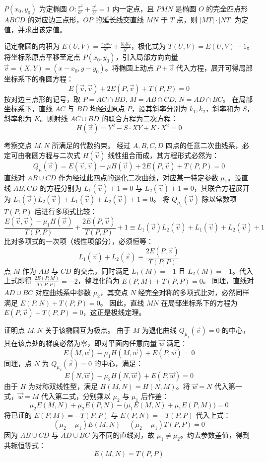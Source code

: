 \begin{exercise}
     \(P(x_0,y_0)\) 为定椭圆 \(O:\frac{x^2}{a^2}+\frac{y^2}{b^2}=1\) 内一定点，且 \(PMN\) 是椭圆 \(O\) 的完全四点形 \(ABCD\) 的对应边三点形，\(OP\) 的延长线交直线 \(MN\) 于 \(T\) 点，则 \(|MT|\cdot|NT|\) 为定值，并求出该定值。
\end{exercise}
\begin{solution}
记定椭圆的内积为 $E(U,V) = \frac{x_U x_V}{a^2} + \frac{y_U y_V}{b^2}$，极化式为 $T(U,V) = E(U,V) - 1$。
将坐标系原点平移至定点 $P(x_0, y_0)$，引入局部方向向量 $\vec{v} = (X, Y) = (x-x_0, y-y_0)$。将椭圆上动点 $P+\vec{v}$ 代入方程，展开可得局部坐标系下的椭圆方程：
$$ E(\vec{v}, \vec{v}) + 2E(P, \vec{v}) + T(P,P) = 0 $$
按对边三点形的记号，取 $P = AC \cap BD$, $M = AB \cap CD$, $N = AD \cap BC$。
在局部坐标系下，直线 $AC$ 与 $BD$ 均经过原点 $P$，设其斜率分别为 $k_1, k_2$，斜率和为 $S$，斜率积为 $K$。则射线 $AC \cup BD$ 的联合方程为二次方程：
$$ H(\vec{v}) = Y^2 - S \cdot XY + K \cdot X^2 = 0 $$

考察交点 $M, N$ 所满足的代数约束。
经过 $A,B,C,D$ 四点的任意二次曲线系，必定可由椭圆方程与二次式 $H(\vec{v})$ 线性组合而成，其方程形式必然为：
$$ Q_\mu(\vec{v}) = E(\vec{v},\vec{v}) - \mu H(\vec{v}) + 2E(P, \vec{v}) + T(P,P) = 0 $$
直线对 $AB \cup CD$ 作为经过此四点的退化二次曲线，对应某一特定参数 $\mu_1$。设直线 $AB, CD$ 的方程分别为 $L_1(\vec{v}) + 1 = 0$ 与 $L_2(\vec{v}) + 1 = 0$，其联合方程展开为 $L_1(\vec{v})L_2(\vec{v}) + L_1(\vec{v}) + L_2(\vec{v}) + 1 = 0$。
将 $Q_{\mu_1}(\vec{v})$ 除以常数项 $T(P,P)$ 后进行多项式比较：
$$ \frac{E(\vec{v},\vec{v}) - \mu_1 H(\vec{v})}{T(P,P)} + \frac{2E(P, \vec{v})}{T(P,P)} + 1 \equiv L_1(\vec{v})L_2(\vec{v}) + L_1(\vec{v}) + L_2(\vec{v}) + 1 $$
比对多项式的一次项（线性项部分），必须恒等：
$$ L_1(\vec{v}) + L_2(\vec{v}) \equiv \frac{2E(P, \vec{v})}{T(P,P)} $$
点 $M$ 作为 $AB$ 与 $CD$ 的交点，同时满足 $L_1(M) = -1$ 且 $L_2(M) = -1$。代入上式即得 $\frac{2E(P, M)}{T(P,P)} = -2$，整理化简为 $E(P, M) + T(P,P) = 0$。
同理，直线对 $AD \cup BC$ 对应曲线系中参数 $\mu_2$，其交点 $N$ 经完全对称的多项式比对，必然同样满足 $E(P, N) + T(P,P) = 0$。
因此，直线 $MN$ 在局部坐标系下的方程为 $E(P, \vec{v}) + T(P,P) = 0$，这正是极线定理。

证明点 $M, N$ 关于该椭圆互为极点。
由于 $M$ 为退化曲线 $Q_{\mu_1}(\vec{v}) = 0$ 的中心，其在该点处的梯度必然为零，即对平面内任意向量 $\vec{w}$ 满足：
$$ E(M, \vec{w}) - \mu_1 H(M, \vec{w}) + E(P, \vec{w}) = 0 $$
同理，点 $N$ 为 $Q_{\mu_2}(\vec{v}) = 0$ 的中心，满足：
$$ E(N, \vec{w}) - \mu_2 H(N, \vec{w}) + E(P, \vec{w}) = 0 $$
由于 $H$ 为对称双线性型，满足 $H(M,N) = H(N,M)$。将 $\vec{w}=N$ 代入第一式，$\vec{w}=M$ 代入第二式，分别乘以 $\mu_2$ 与 $\mu_1$ 后作差：
$$ \mu_2 E(M,N) + \mu_2 E(P,N) - \big( \mu_1 E(M,N) + \mu_1 E(P,M) \big) = 0 $$
将已证的 $E(P,M) = -T(P,P)$ 与 $E(P,N) = -T(P,P)$ 代入上式：
$$ (\mu_2 - \mu_1) E(M,N) - (\mu_2 - \mu_1) T(P,P) = 0 $$
因为 $AB \cup CD$ 与 $AD \cup BC$ 为不同的直线对，故 $\mu_1 \neq \mu_2$。约去参数差值，得到共轭恒等式：
$$ E(M,N) = T(P,P) $$


\end{solution}
